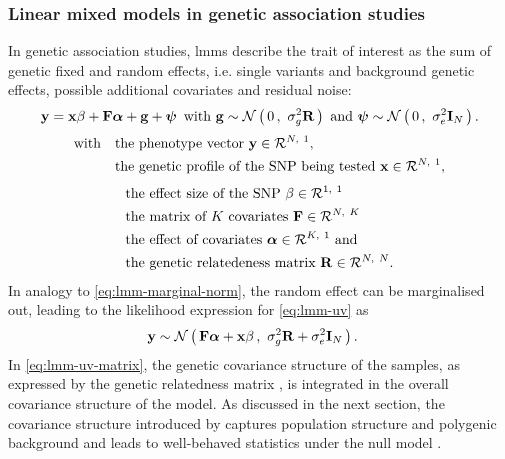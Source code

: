 \subsubsection{Linear mixed models in genetic association studies}
\label{subsection:lmm-genetics}
In genetic association studies, \glspl{lmm} describe the trait of interest as the sum of genetic fixed and random effects, i.e. single variants and background genetic effects, possible additional covariates and residual noise: 
%
\begin{equation}
\boldsymbol{\mathbf{y}} =\boldsymbol{\mathbf{x}}\beta + \boldsymbol{\mathbf{F}}\boldsymbol{\mathbf{\alpha}} + \boldsymbol{\mathbf{g}}+\boldsymbol{\mathbf{\psi}} \, \text{ with } \boldsymbol{\mathbf{g}} \sim \mathcal{N}\left(\,{0}\,,~{\sigma_g^2\boldsymbol{\mathbf{R}}}\,\right) \text{ and } \boldsymbol{\mathbf{\psi}} \sim\mathcal{N}\left(\,{0}\,,~{\sigma_e^2\boldsymbol{\mathbf{I}}_N}\,\right).
\label{eq:lmm-uv}
\end{equation}
%
\begin{align*} 
\text{with }\,\,\,\,& \text{the phenotype vector }\boldsymbol{\mathbf{y}} \in \mathcal{R}^{N,~1},\\
& \text{the genetic profile of the SNP being tested }\boldsymbol{\mathbf{x}} \in \mathcal{R}^{N,~1},
\end{align*} %
\begin{align*}
& \text{the effect size of the SNP } \beta \in \mathcal{R}^{1,~1}\\ 
& \text{the matrix of $K$ covariates }\boldsymbol{\mathbf{F}} \in \mathcal{R}^{N,~K}\\ 
& \text{the effect of covariates } \boldsymbol{\mathbf{\alpha}} \in \mathcal{R}^{K,~1} \text{ and}\\
& \text{the genetic relatedeness matrix }\boldsymbol{\mathbf{R}} \in \mathcal{R}^{N,~N}.
\end{align*} 
%
In analogy to \cref{eq:lmm-marginal-norm}, the random effect  can be marginalised out, leading to the likelihood expression for \cref{eq:lmm-uv} as
\begin{align}
\boldsymbol{\mathbf{y}} &\sim \mathcal{N}\left(\,{\boldsymbol{\mathbf{F}}\boldsymbol{\mathbf{\alpha}} +\boldsymbol{\mathbf{x}}\beta}\,,~{\sigma_g^2\boldsymbol{\mathbf{R}} + \sigma_e^2\boldsymbol{\mathbf{I}}_N}\,\right).
\label{eq:lmm-uv-matrix}
\end{align}
%
In \cref{eq:lmm-uv-matrix}, the genetic covariance structure of the samples, as expressed by the genetic relatedness matrix , is integrated in the overall covariance structure of the model. As discussed in the next section, the covariance structure introduced by  captures population structure and polygenic background and leads to well-behaved statistics under the null model \citep{Yu2006,Kang2008}.

